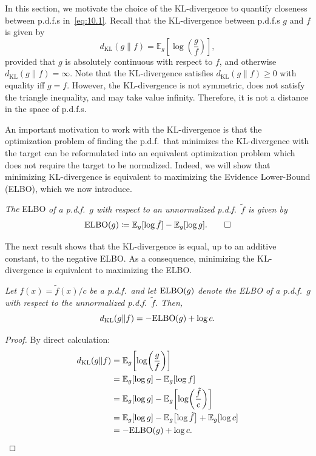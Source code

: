 In this section, we motivate the choice of the KL-divergence to quantify closeness between p.d.f.s
in~\eqref{eq:10.1}. Recall that the KL-divergence between p.d.f.s $g$ and $f$ is given by
\[
  d_{\mathrm{KL}}(g \| f) = \mathbb{E}_g\!\left[\log\!\left(\frac{g}{f}\right)\right],
\]
provided that $g$ is absolutely continuous with respect to $f$, and otherwise $d_{\mathrm{KL}}(g\|f) = \infty$.
Note that the KL-divergence satisfies $d_{\mathrm{KL}}(g\|f) \geq 0$ with equality iff $g = f$. However,
the KL-divergence is not symmetric, does not satisfy the triangle inequality, and may take value
infinity. Therefore, it is not a distance in the space of p.d.f.s.

An important motivation to work with the KL-divergence is that the optimization problem of finding
the p.d.f.\ that minimizes the KL-divergence with the target can be reformulated into an equivalent
optimization problem which does not require the target to be normalized. Indeed, we will show that
minimizing KL-divergence is equivalent to maximizing the Evidence Lower-Bound (ELBO), which we now
introduce.

\begin{definition}
  \label{def:10.1}
  \textit{The} ELBO \textit{of a p.d.f.\ $g$ with respect to an unnormalized p.d.f.\ $\tilde{f}$
  is given by}
  \[
    \mathrm{ELBO}(g) \coloneqq \mathbb{E}_g[\log \tilde{f}] - \mathbb{E}_g[\log g]. \qquad \square
  \]
\end{definition}

The next result shows that the KL-divergence is equal, up to an additive constant, to the negative
ELBO\@. As a consequence, minimizing the KL-divergence is equivalent to maximizing the ELBO\@.

\begin{theorem}
  \label{thm:10.2}
  \textit{Let $f(x) = \tilde{f}(x)/c$ be a p.d.f.\ and let $\mathrm{ELBO}(g)$ denote the ELBO of a p.d.f.\
  $g$ with respect to the unnormalized p.d.f.\ $\tilde{f}$. Then,}
  \[
    d_{\mathrm{KL}}(g \| f) = -\mathrm{ELBO}(g) + \log c.
  \]
\end{theorem}

\begin{proof}
By direct calculation:
\begin{align*}
  d_{\mathrm{KL}}(g \| f)
    &= \mathbb{E}_g\!\left[\log\!\left(\frac{g}{f}\right)\right] \\
    &= \mathbb{E}_g[\log g] - \mathbb{E}_g[\log f] \\
    &= \mathbb{E}_g[\log g] - \mathbb{E}_g\!\left[\log\!\left(\frac{\tilde{f}}{c}\right)\right] \\
    &= \mathbb{E}_g[\log g] - \mathbb{E}_g\!\left[\log \tilde{f}\right] + \mathbb{E}_g[\log c] \\
    &= -\mathrm{ELBO}(g) + \log c. \qedhere
\end{align*}
\end{proof}

